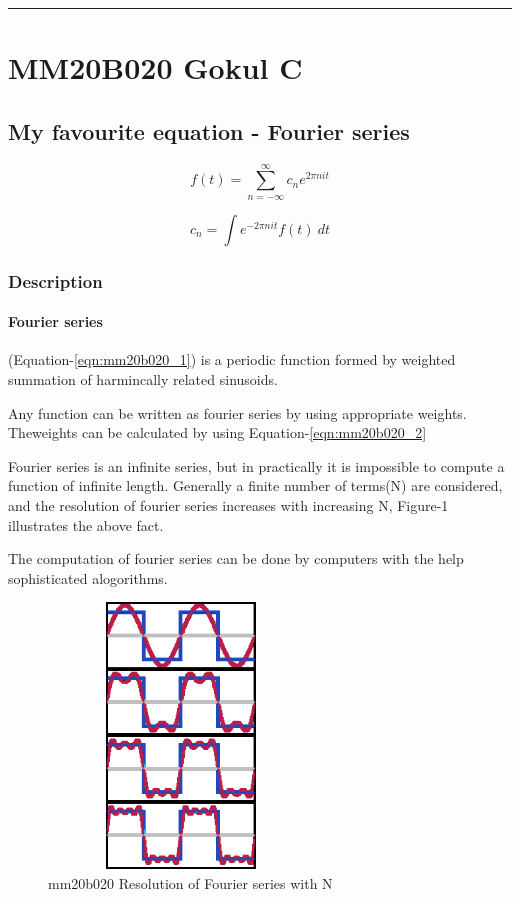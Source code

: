 \hrule

\section{MM20B020 Gokul C}

\subsection{My favourite equation - Fourier series}

\begin{equation}
f(t)=\sum_{n=-\infty}^{\infty} c_n e^{2 \pi n i t}
\label{eqn:mm20b020_1}
\end{equation}

\begin{equation}
c_n=\int  e^{-2 \pi n i t} f(t)\ dt
\label{eqn:mm20b020_2}
\end{equation}

\subsubsection{Description}
\paragraph{Fourier series} (Equation-\ref{eqn:mm20b020_1}) is a periodic function formed by weighted summation of harmincally related sinusoids. \cite{MITOPENCOURSEWARE_mm20b020}

Any function can be written as fourier series by using appropriate weights. Theweights can be calculated by using Equation-\ref{eqn:mm20b020_2}

Fourier series is an infinite series, but in practically it is impossible to compute a function of infinite length. Generally a finite number of terms(N) are considered, and the resolution of fourier series increases with increasing N, Figure-1 illustrates the above fact.

The computation of fourier series can be done by computers with the help sophisticated alogorithms. \cite{Cooley_mm20b020}

\begin{figure}[H]
	\begin{center}
		\includegraphics[width=200pt, height=200pt]{Fourier_series.eps}
	\end{center}
	\caption{mm20b020 Resolution of Fourier series with N\cite{Wikipedia_mm20b020}} 
	\label{fig:mm20b020}
\end{figure}

